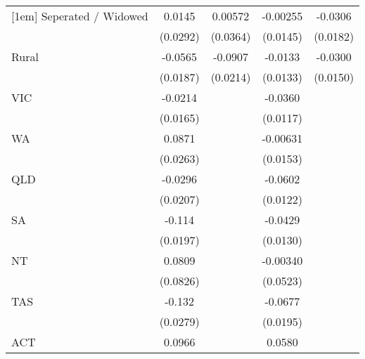 {\begin{tabular}{l*{4}{c}}
[1em]
Seperated / Widowed &      0.0145         &     0.00572         &    -0.00255         &     -0.0306         \\
                    &    (0.0292)         &    (0.0364)         &    (0.0145)         &    (0.0182)         \\
[1em]
Rural               &     -0.0565\sym{**} &     -0.0907\sym{***}&     -0.0133         &     -0.0300\sym{*}  \\
                    &    (0.0187)         &    (0.0214)         &    (0.0133)         &    (0.0150)         \\
[1em]
VIC                 &     -0.0214         &                     &     -0.0360\sym{**} &                     \\
                    &    (0.0165)         &                     &    (0.0117)         &                     \\
[1em]
WA                  &      0.0871\sym{***}&                     &    -0.00631         &                     \\
                    &    (0.0263)         &                     &    (0.0153)         &                     \\
[1em]
QLD                 &     -0.0296         &                     &     -0.0602\sym{***}&                     \\
                    &    (0.0207)         &                     &    (0.0122)         &                     \\
[1em]
SA                  &      -0.114\sym{***}&                     &     -0.0429\sym{**} &                     \\
                    &    (0.0197)         &                     &    (0.0130)         &                     \\
[1em]
NT                  &      0.0809         &                     &    -0.00340         &                     \\
                    &    (0.0826)         &                     &    (0.0523)         &                     \\
[1em]
TAS                 &      -0.132\sym{***}&                     &     -0.0677\sym{***}&                     \\
                    &    (0.0279)         &                     &    (0.0195)         &                     \\
[1em]
ACT                 &      0.0966\sym{*}  &                     &      0.0580\sym{**} &                     \\

\end{tabular}}
